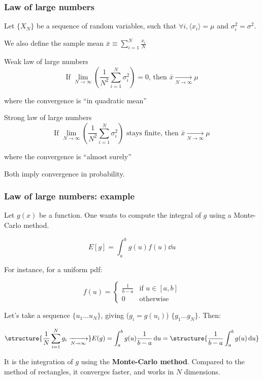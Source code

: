 \documentclass[9pt]{beamer}
\newif\ifmynote
\newcommand\mynote[1]{%
\ifmynote \textbf{#1} \else \fi
}
\begin{document}
\begin{frame}
 \frametitle{Law of large numbers}
 
 \mynote{Écrire au tableau}
 
 Let $\{X_N\}$ be a sequence of random variables, such that $\forall i, \langle x_i \rangle = \mu$ and $\sigma^2_i = \sigma^2$. 
 
 We also define the sample mean
 $\bar{x} \equiv \sum_{i=1}^N \frac{x_i}{N}$
 
 \begin{block}{Weak law of large numbers}
  $$\text{If } \lim_{N \to \infty} \left( \frac{1}{N^2} \sum_{i=1}^N \sigma^2_i\right) = 0\text{, then } \bar{x} \xrightarrow[N \to \infty]{} \mu$$
  
  where the convergence is ``in quadratic mean''
 \end{block}
 
 \begin{block}{Strong law of large numbers}
  $$\text{If } \lim_{N \to \infty} \left( \frac{1}{N^2} \sum_{i=1}^N \sigma^2_i\right)\text{ stays finite, then } \bar{x} \xrightarrow[N \to \infty]{} \mu$$
  
  where the convergence is ``almost surely''
 \end{block}
 
 Both imply convergence in probability.

\end{frame}

\begin{frame}
 \frametitle{Law of large numbers: example}
 
 \mynote{Écrire au tableau}
 
 Let $g(x)$ be a function. One wants to compute the integral of $g$ using a Monte-Carlo method.
 
 $$E[g] = \int_a^b g(u) f(u) \dd u$$
 
 For instance, for a uniform pdf: 
 
 $$f(u) = 
 \begin{cases} 
      \frac{1}{b-a} & \text{if } u \in [a,b] \\ 
      0 & \text{otherwise}
   \end{cases}
$$

Let's take a sequence $\{ u_1 \dots u_N\}$, giving ($g_i = g(u_i)$) $\{ g_1 \dots g_N\}$. Then:

$$\structure{\frac{1}{N} \sum_{i=1}^N g_i \xrightarrow[N \to \infty]{}} E(g) = \int_a^b g(u) \frac{1}{b-a} \dd u = \structure{\frac{1}{b-a} \int_a^b g(u) \dd u}$$

It is the integration of $g$ using the \textbf{Monte-Carlo method}. Compared to the method of rectangles, it converges faster, and works in $N$ dimensions.
\end{frame}
\end{document}
